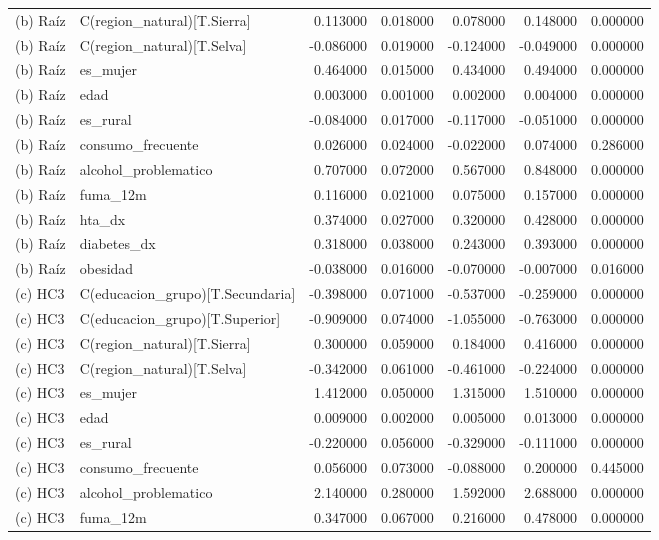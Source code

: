 \begin{longtable}{llrrrrr}
(b) Raíz & C(region\_natural)[T.Sierra] & 0.113000 & 0.018000 & 0.078000 & 0.148000 & 0.000000 \\
(b) Raíz & C(region\_natural)[T.Selva] & -0.086000 & 0.019000 & -0.124000 & -0.049000 & 0.000000 \\
(b) Raíz & es\_mujer & 0.464000 & 0.015000 & 0.434000 & 0.494000 & 0.000000 \\
(b) Raíz & edad & 0.003000 & 0.001000 & 0.002000 & 0.004000 & 0.000000 \\
(b) Raíz & es\_rural & -0.084000 & 0.017000 & -0.117000 & -0.051000 & 0.000000 \\
(b) Raíz & consumo\_frecuente & 0.026000 & 0.024000 & -0.022000 & 0.074000 & 0.286000 \\
(b) Raíz & alcohol\_problematico & 0.707000 & 0.072000 & 0.567000 & 0.848000 & 0.000000 \\
(b) Raíz & fuma\_12m & 0.116000 & 0.021000 & 0.075000 & 0.157000 & 0.000000 \\
(b) Raíz & hta\_dx & 0.374000 & 0.027000 & 0.320000 & 0.428000 & 0.000000 \\
(b) Raíz & diabetes\_dx & 0.318000 & 0.038000 & 0.243000 & 0.393000 & 0.000000 \\
(b) Raíz & obesidad & -0.038000 & 0.016000 & -0.070000 & -0.007000 & 0.016000 \\
(c) HC3 & C(educacion\_grupo)[T.Secundaria] & -0.398000 & 0.071000 & -0.537000 & -0.259000 & 0.000000 \\
(c) HC3 & C(educacion\_grupo)[T.Superior] & -0.909000 & 0.074000 & -1.055000 & -0.763000 & 0.000000 \\
(c) HC3 & C(region\_natural)[T.Sierra] & 0.300000 & 0.059000 & 0.184000 & 0.416000 & 0.000000 \\
(c) HC3 & C(region\_natural)[T.Selva] & -0.342000 & 0.061000 & -0.461000 & -0.224000 & 0.000000 \\
(c) HC3 & es\_mujer & 1.412000 & 0.050000 & 1.315000 & 1.510000 & 0.000000 \\
(c) HC3 & edad & 0.009000 & 0.002000 & 0.005000 & 0.013000 & 0.000000 \\
(c) HC3 & es\_rural & -0.220000 & 0.056000 & -0.329000 & -0.111000 & 0.000000 \\
(c) HC3 & consumo\_frecuente & 0.056000 & 0.073000 & -0.088000 & 0.200000 & 0.445000 \\
(c) HC3 & alcohol\_problematico & 2.140000 & 0.280000 & 1.592000 & 2.688000 & 0.000000 \\
(c) HC3 & fuma\_12m & 0.347000 & 0.067000 & 0.216000 & 0.478000 & 0.000000 \\

\end{longtable}
